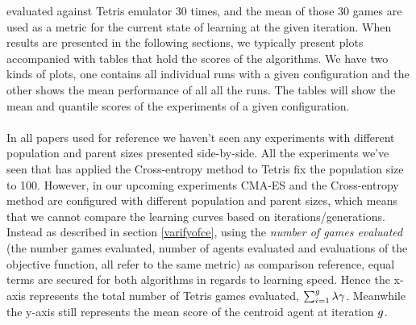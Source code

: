 evaluated against Tetris emulator 30 times, and the mean of those 30 games are used as
a metric for the current state of learning at the given iteration. When results are presented 
in the following sections, we typically present plots accompanied with tables 
that hold the scores of the algorithms. We have two kinds of plots, one contains all
individual runs with a given configuration and the other shows the mean performance
of all all the runs. The tables will show the mean and quantile scores of the experiments
of a given configuration.\\
\\
In all papers used for reference we haven't seen any experiments with different population
and parent sizes presented side-by-side. All the experiments we've seen
that has applied the Cross-entropy method to Tetris fix the population size to 100. 
However, in our upcoming experiments
CMA-ES and the Cross-entropy method are configured with different population and parent sizes, which means
that we cannot compare the learning curves based on iterations/generations. Instead as described
in section \ref{varifyofce}, using the  
\textit{number of games evaluated} (the number games evaluated, number of agents evaluated and evaluations of the objective function, all refer to the same metric) as comparison reference, equal terms are secured for both algorithms 
in regards to learning speed.
Hence the x-axis represents the total number 
of Tetris games evaluated, 
$\sum_{i = 1}^{g} \lambda \gamma$. 
Meanwhile the y-axis still represents the mean score 
of the centroid agent at iteration $g$.\\














